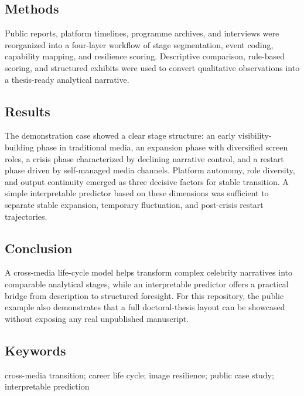 \begin{titlepage}
    \subsection*{Methods}
    Public reports, platform timelines, programme archives, and interviews were reorganized into a four-layer workflow of stage segmentation, event coding, capability mapping, and resilience scoring. Descriptive comparison, rule-based scoring, and structured exhibits were used to convert qualitative observations into a thesis-ready analytical narrative.

    \subsection*{Results}
    The demonstration case showed a clear stage structure: an early visibility-building phase in traditional media, an expansion phase with diversified screen roles, a crisis phase characterized by declining narrative control, and a restart phase driven by self-managed media channels. Platform autonomy, role diversity, and output continuity emerged as three decisive factors for stable transition. A simple interpretable predictor based on these dimensions was sufficient to separate stable expansion, temporary fluctuation, and post-crisis restart trajectories.

    \subsection*{Conclusion}
    A cross-media life-cycle model helps transform complex celebrity narratives into comparable analytical stages, while an interpretable predictor offers a practical bridge from description to structured foresight. For this repository, the public example also demonstrates that a full doctoral-thesis layout can be showcased without exposing any real unpublished manuscript.

    \subsection*{Keywords}
    cross-media transition; career life cycle; image resilience; public case study; interpretable prediction

\clearpage{\cleardoublepage}
\end{titlepage}
